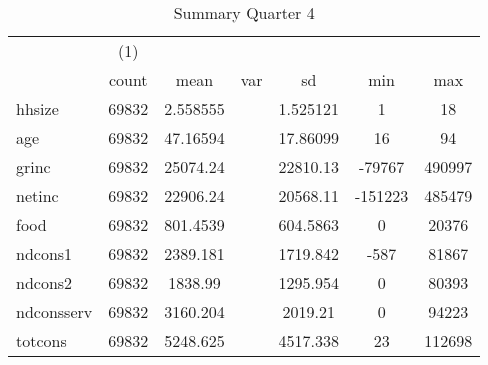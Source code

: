 \begin{table}[htbp]\centering
\def\sym#1{\ifmmode^{#1}\else\(^{#1}\)\fi}
\caption{Summary Quarter 4 \label{sum\_Q4}}
\begin{tabular}{l*{1}{cccccc}}
\hline\hline
            &\multicolumn{1}{c}{(1)}&            &            &            &            &            \\
            &       count&        mean&         var&          sd&         min&         max\\
\hline
hhsize      &       69832&    2.558555&            &    1.525121&           1&          18\\
age         &       69832&    47.16594&            &    17.86099&          16&          94\\
grinc       &       69832&    25074.24&            &    22810.13&      -79767&      490997\\
netinc      &       69832&    22906.24&            &    20568.11&     -151223&      485479\\
food        &       69832&    801.4539&            &    604.5863&           0&       20376\\
ndcons1     &       69832&    2389.181&            &    1719.842&        -587&       81867\\
ndcons2     &       69832&     1838.99&            &    1295.954&           0&       80393\\
ndconsserv  &       69832&    3160.204&            &     2019.21&           0&       94223\\
totcons     &       69832&    5248.625&            &    4517.338&          23&      112698\\
\hline\hline
\end{tabular}
\end{table}
